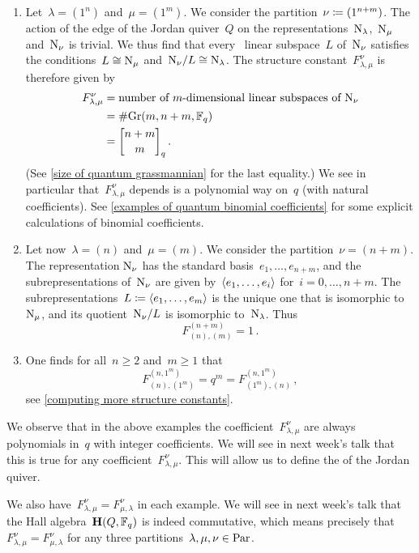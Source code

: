 \documentclass[a4paper, 11pt, twoside=semi]{scrartcl}
\begin{document}
\begin{example}
  \leavevmode
  \begin{enumerate}
    \item
      Let~$\lambda = (1^n)$ and~$\mu = (1^m)$.
      We consider the partition~$\nu \coloneqq (1^{n+m})$.
      The action of the edge of the Jordan quiver~$Q$ on the representations~$\mathrm{N}_\lambda$,~$\mathrm{N}_\mu$ and~$\mathrm{N}_\nu$ is trivial.
      We thus find that every~ linear subspace~$L$ of~$\mathrm{N}_{\nu}$ satisfies the conditions~$L \cong \mathrm{N}_\mu$ and~$\mathrm{N}_\nu / L \cong \mathrm{N}_\lambda$.
      The structure constant~$F^{\nu}_{\lambda, \mu}$ is therefore given by
      \begin{align*}
        F^{\nu}_{\lambda, \mu}
        &=
        \text{number of~\dimensional{$m$} linear subspaces of~$\Nil_{\nu}$}
        \\
        &=
        \counting {\Gr(m, n+m, \Finite_q)}
        \\
        &=
        \qbinom{n+m}{m}_q \,.
      \end{align*}
      (See \cref{size of quantum grassmannian} for the last equality.)
      We see in particular that~$F^{\nu}_{\lambda, \mu}$ depends is a polynomial way on~$q$ (with natural coefficients). 
      See \cref{examples of quantum binomial coefficients} for some explicit calculations of binomial coefficients.
    \item
      Let now~$\lambda = (n)$ and~$\mu = (m)$.
      We consider the partition~$\nu = (n+m)$. 
      The representation$~\mathrm{N}_{\nu}$ has the standard basis~$e_1, \dotsc, e_{n+m}$, and the subrepresentations of~$\mathrm{N}_{\nu}$ are given by~$\langle e_1, \dotsc, e_i\rangle$ for~$i = 0, \dotsc, n+m$.
      The subrepresentations~$L \coloneqq \langle e_1, \dotsc, e_m\rangle$ is the unique one that is isomorphic to~$\mathrm{N}_\mu$, and its quotient~$\mathrm{N}_\nu / L$ is isomorphic to~$\mathrm{N}_\lambda$.
      Thus
      \[
        F^{(n+m)}_{(n),(m)}
        =
        1 \,.
      \]
    \item
      One finds for all~$n \geq 2$ and~$m \geq 1$ that
      \[
        F^{(n, 1^m)}_{(n), (1^m)}
        =
        q^m
        =
        F^{(n, 1^m)}_{(1^m), (n)} \,,
      \]
      see \cref{computing more structure constants}.
  \end{enumerate}
  We observe that in the above examples the coefficient~$F^{\nu}_{\lambda, \mu}$ are always polynomials in~$q$ with integer coefficients.
  We will see in next week’s talk that this is true for any coefficient~$F^{\nu}_{\lambda, \mu}$.
  This will allow us to define the  of the Jordan quiver.

  We also have~$F^{\nu}_{\lambda, \mu} = F^{\nu}_{\mu, \lambda}$ in each example.
  We will see in next week’s talk that the Hall algebra~$\mathbf{H}(Q, \mathbb{F}_q)$ is indeed commutative, which means precisely that~$F^\nu_{\lambda, \mu} = F^\nu_{\mu, \lambda}$ for any three partitions~$\lambda, \mu, \nu \in \mathrm{Par}$.
\end{example}
\end{document}
